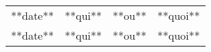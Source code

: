 \small
\begin{tabular}{|p{1.5cm}| >{\raggedright}p{2.5cm}|p{2.5cm}|p{8.5cm}|}
  \hline
  \rowcolor{Gainsboro} \color{Navy}{\bfseries Date}  & \color{Navy}{\bfseries Auteur} & \color{Navy}{\bfseries Section(s)}  &\color{Navy}{\bfseries Commentaires} \\
  \hline
  **date** & **qui** & **ou** & **quoi**\\
  \hline
  **date** & **qui** & **ou** & **quoi**\\
  \hline
\end{tabular}
\normalsize
